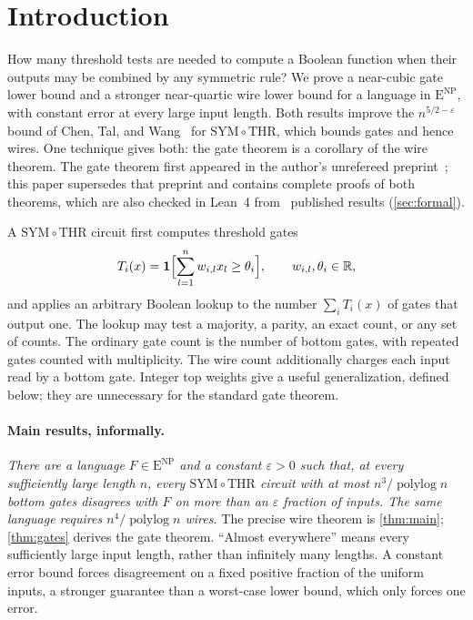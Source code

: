 \documentclass[11pt,letterpaper]{article}
\theoremstyle{definition}
\theoremstyle{remark}
\newcommand{\R}{\mathbb R}
\newcommand{\THR}{\mathrm{THR}}
\newcommand{\SYM}{\mathrm{SYM}}
\newcommand{\ENP}{\mathrm{E}^{\mathrm{NP}}}
\newcommand{\polylog}{\operatorname{polylog}}
\newcommand{\ind}{\mathbf 1}
\begin{document}
\clearpage
\tableofcontents
\clearpage

\section{Introduction}\label{sec:intro}

How many threshold tests are needed to compute a Boolean function
when their outputs may be combined by any symmetric rule? We prove
a near-cubic gate lower bound and a stronger near-quartic wire lower
bound for a language in \(\ENP\), with constant error at every large
input length. Both results improve the \(n^{5/2-\varepsilon}\) bound of Chen, Tal, and Wang~\cite{CTW26} for \(\SYM\circ\THR\), which bounds gates and hence wires. One technique gives both: the gate theorem is a corollary of the wire theorem.
The gate theorem first appeared in the author's unrefereed preprint~\cite{NagCG}; this paper supersedes that preprint and contains complete proofs of both theorems, which are also checked in Lean~4 from \publishedinputcount\ published results (\cref{sec:formal}).

A \(\SYM\circ\THR\) circuit first computes threshold gates
\[
 T_i(x)=\ind\Bigl[\sum_{l=1}^n w_{i,l}x_l\ge\theta_i\Bigr],
 \qquad w_{i,l},\theta_i\in\R,
\]
and applies an arbitrary Boolean lookup to the number
\(\sum_iT_i(x)\) of gates that output one. The lookup may test a
majority, a parity, an exact count, or any set of counts. The ordinary gate count is the number of bottom gates, with
repeated gates counted with multiplicity. The wire count additionally
charges each input read by a bottom gate. Integer top weights give a
useful generalization, defined below; they are unnecessary for the
standard gate theorem.

\paragraph{Main results, informally.}
\emph{There are a language \(F\in\ENP\) and a constant
\(\varepsilon>0\) such that, at every sufficiently large length
\(n\), every \(\SYM\circ\THR\) circuit with at most
\(n^3/\polylog n\) bottom gates disagrees with \(F\) on more than
an \(\varepsilon\) fraction of inputs. The same language requires
\(n^4/\polylog n\) wires.}
The precise wire theorem is \cref{thm:main}; \cref{thm:gates}
derives the gate theorem. ``Almost everywhere'' means every
sufficiently large input length, rather than infinitely many lengths.
A constant error bound forces disagreement on a fixed positive
fraction of the uniform inputs, a stronger guarantee than a
worst-case lower bound, which only forces one error.
\end{document}
